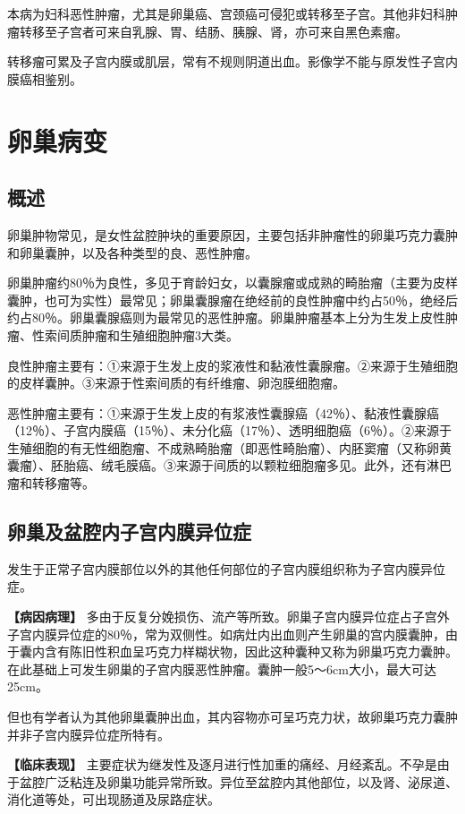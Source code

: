 本病为妇科恶性肿瘤，尤其是卵巢癌、宫颈癌可侵犯或转移至子宫。其他非妇科肿瘤转移至子宫者可来自乳腺、胃、结肠、胰腺、肾，亦可来自黑色素瘤。

转移瘤可累及子宫内膜或肌层，常有不规则阴道出血。影像学不能与原发性子宫内膜癌相鉴别。

\section{卵巢病变}

\subsection{概述}

卵巢肿物常见，是女性盆腔肿块的重要原因，主要包括非肿瘤性的卵巢巧克力囊肿和卵巢囊肿，以及各种类型的良、恶性肿瘤。

卵巢肿瘤约80％为良性，多见于育龄妇女，以囊腺瘤或成熟的畸胎瘤（主要为皮样囊肿，也可为实性）最常见；卵巢囊腺瘤在绝经前的良性肿瘤中约占50％，绝经后约占80％。卵巢囊腺癌则为最常见的恶性肿瘤。卵巢肿瘤基本上分为生发上皮性肿瘤、性索间质肿瘤和生殖细胞肿瘤3大类。

良性肿瘤主要有：①来源于生发上皮的浆液性和黏液性囊腺瘤。②来源于生殖细胞的皮样囊肿。③来源于性索间质的有纤维瘤、卵泡膜细胞瘤。

恶性肿瘤主要有：①来源于生发上皮的有浆液性囊腺癌（42％）、黏液性囊腺癌（12％）、子宫内膜癌（15％）、未分化癌（17％）、透明细胞癌（6％）。②来源于生殖细胞的有无性细胞瘤、不成熟畸胎瘤（即恶性畸胎瘤）、内胚窦瘤（又称卵黄囊瘤）、胚胎癌、绒毛膜癌。③来源于间质的以颗粒细胞瘤多见。此外，还有淋巴瘤和转移瘤等。

\subsection{卵巢及盆腔内子宫内膜异位症}

发生于正常子宫内膜部位以外的其他任何部位的子宫内膜组织称为子宫内膜异位症。

\textbf{【病因病理】}
多由于反复分娩损伤、流产等所致。卵巢子宫内膜异位症占子宫外子宫内膜异位症的80％，常为双侧性。如病灶内出血则产生卵巢的宫内膜囊肿，由于囊内含有陈旧性积血呈巧克力样糊状物，因此这种囊种又称为卵巢巧克力囊肿。在此基础上可发生卵巢的子宫内膜恶性肿瘤。囊肿一般5～6cm大小，最大可达25cm。

但也有学者认为其他卵巢囊肿出血，其内容物亦可呈巧克力状，故卵巢巧克力囊肿并非子宫内膜异位症所特有。

\textbf{【临床表现】}
主要症状为继发性及逐月进行性加重的痛经、月经紊乱。不孕是由于盆腔广泛粘连及卵巢功能异常所致。异位至盆腔内其他部位，以及肾、泌尿道、消化道等处，可出现肠道及尿路症状。

